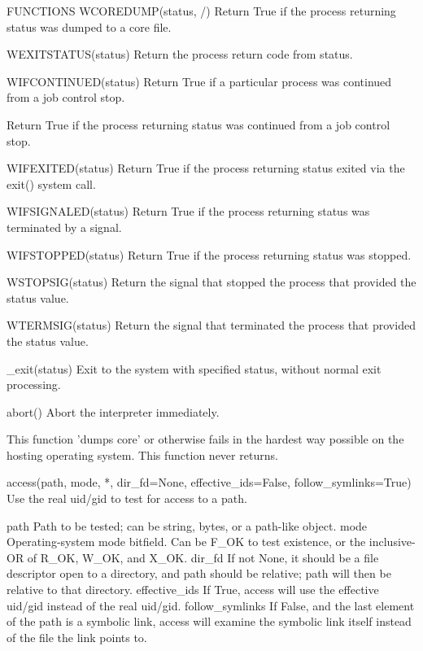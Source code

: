 \documentclass{article}
\begin{document}
FUNCTIONS
    WCOREDUMP(status, /)
        Return True if the process returning status was dumped to a core file.

    WEXITSTATUS(status)
        Return the process return code from status.

    WIFCONTINUED(status)
        Return True if a particular process was continued from a job control stop.

        Return True if the process returning status was continued from a
        job control stop.

    WIFEXITED(status)
        Return True if the process returning status exited via the exit() system call.

    WIFSIGNALED(status)
        Return True if the process returning status was terminated by a signal.

    WIFSTOPPED(status)
        Return True if the process returning status was stopped.

    WSTOPSIG(status)
        Return the signal that stopped the process that provided the status value.

    WTERMSIG(status)
        Return the signal that terminated the process that provided the status value.

    _exit(status)
        Exit to the system with specified status, without normal exit processing.

    abort()
        Abort the interpreter immediately.

        This function 'dumps core' or otherwise fails in the hardest way possible
        on the hosting operating system.  This function never returns.

    access(path, mode, *, dir_fd=None, effective_ids=False, follow_symlinks=True)
        Use the real uid/gid to test for access to a path.

          path
            Path to be tested; can be string, bytes, or a path-like object.
          mode
            Operating-system mode bitfield.  Can be F_OK to test existence,
            or the inclusive-OR of R_OK, W_OK, and X_OK.
          dir_fd
            If not None, it should be a file descriptor open to a directory,
            and path should be relative; path will then be relative to that
            directory.
          effective_ids
            If True, access will use the effective uid/gid instead of
            the real uid/gid.
          follow_symlinks
            If False, and the last element of the path is a symbolic link,
            access will examine the symbolic link itself instead of the file
            the link points to.
\end{document}
